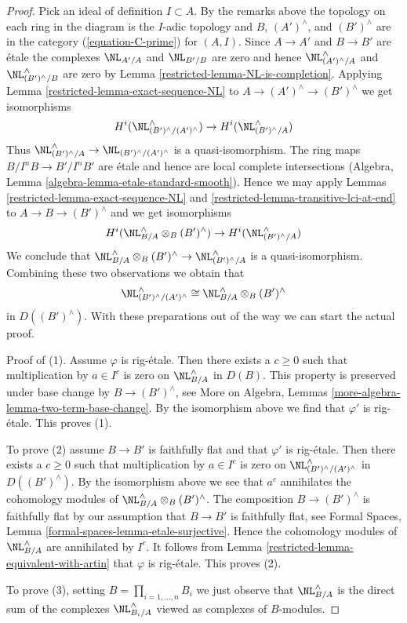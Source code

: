 \begin{proof}
\medskip\noindent
Pick an ideal of definition $I \subset A$. By the remarks above
the topology on each ring in the diagram is the $I$-adic topology
and $B$, $(A')^\wedge$, and $(B')^\wedge$ are in the category
(\ref{equation-C-prime}) for $(A, I)$.
Since $A \to A'$ and $B \to B'$ are \'etale the complexes
$\NL_{A'/A}$ and $\NL_{B'/B}$ are zero and hence
$\NL_{(A')^\wedge/A}^\wedge$ and $\NL_{(B')^\wedge/B}^\wedge$
are zero by Lemma \ref{restricted-lemma-NL-is-completion}.
Applying Lemma \ref{restricted-lemma-exact-sequence-NL} to
$A \to (A')^\wedge \to (B')^\wedge$ we get isomorphisms
$$
H^i(\NL_{(B')^\wedge/(A')^\wedge}^\wedge) \to H^i(\NL_{(B')^\wedge/A}^\wedge)
$$
Thus $\NL_{(B')^\wedge/A}^\wedge \to \NL_{(B')^\wedge/(A')^\wedge}$
is a quasi-isomorphism. The ring maps $B/I^nB \to B'/I^nB'$ are \'etale
and hence are local complete intersections
(Algebra, Lemma \ref{algebra-lemma-etale-standard-smooth}).
Hence we may apply
Lemmas \ref{restricted-lemma-exact-sequence-NL} and
\ref{restricted-lemma-transitive-lci-at-end} to
$A \to B \to (B')^\wedge$ and we get isomorphisms
$$
H^i(\NL_{B/A}^\wedge \otimes_B (B')^\wedge) \to
H^i(\NL_{(B')^\wedge/A}^\wedge)
$$
We conclude that
$\NL_{B/A}^\wedge \otimes_B (B')^\wedge \to \NL_{(B')^\wedge/A}^\wedge$
is a quasi-isomorphism. Combining these two observations we obtain that
$$
\NL_{(B')^\wedge/(A')^\wedge}^\wedge \cong
\NL_{B/A}^\wedge \otimes_B (B')^\wedge
$$
in $D((B')^\wedge)$.
With these preparations out of the way we can start the actual proof.

\medskip\noindent
Proof of (1). Assume $\varphi$ is rig-\'etale. Then there exists a $c \geq 0$
such that multiplication by $a \in I^c$ is zero on $\NL_{B/A}^\wedge$
in $D(B)$. This property is preserved under base change
by $B \to (B')^\wedge$, see
More on Algebra, Lemmas \ref{more-algebra-lemma-two-term-base-change}.
By the isomorphism above we find that $\varphi'$ is rig-\'etale.
This proves (1).

\medskip\noindent
To prove (2) assume $B \to B'$ is faithfully flat and that $\varphi'$
is rig-\'etale. Then there exists a $c \geq 0$ such that
multiplication by $a \in I^c$ is zero on
$\NL_{(B')^\wedge/(A')^\wedge}^\wedge$ in $D((B')^\wedge)$.
By the isomorphism above we see that $a^c$ annihilates the
cohomology modules of
$\NL_{B/A}^\wedge \otimes_B (B')^\wedge$.
The composition $B \to (B')^\wedge$ is faithfully flat
by our assumption that $B \to B'$ is faithfully flat, see
Formal Spaces, Lemma \ref{formal-spaces-lemma-etale-surjective}.
Hence the cohomology modules of $\NL_{B/A}^\wedge$ are annihilated
by $I^c$. It follows from Lemma \ref{restricted-lemma-equivalent-with-artin}
that $\varphi$ is rig-\'etale.
This proves (2).

\medskip\noindent
To prove (3), setting $B = \prod_{i = 1, \ldots, n} B_i$
we just observe that $\NL_{B/A}^\wedge$ is the direct
sum of the complexes $\NL_{B_i/A}^\wedge$ viewed as complexes
of $B$-modules.
\end{proof}

